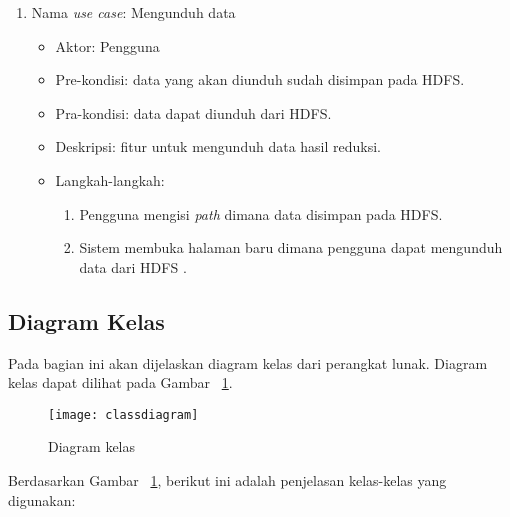 \begin{enumerate}
\begin{itemize}
\end{itemize}


\item Nama \textit{use case}: Mengunduh data

\begin{itemize}
\item Aktor: Pengguna

\item Pre-kondisi: data yang akan diunduh sudah disimpan pada HDFS.

\item Pra-kondisi: data dapat diunduh dari HDFS.

\item Deskripsi: fitur untuk mengunduh data hasil reduksi.

\item Langkah-langkah:

\begin{enumerate}

\item Pengguna mengisi \textit{path} dimana data disimpan pada HDFS.

\item Sistem membuka halaman baru dimana pengguna dapat mengunduh data dari HDFS .

\end{enumerate}

\end{itemize}

\end{enumerate}


\subsection{Diagram Kelas}

Pada bagian ini akan dijelaskan diagram kelas dari perangkat lunak. Diagram kelas dapat dilihat pada Gambar ~\ref{fig:classdiagram}.

\begin{figure}[H]
    \centering  
    \texttt{[image: classdiagram]}  
    \caption[Diagram kelas]{Diagram kelas} 
    \label{fig:classdiagram} 
\end{figure}

Berdasarkan Gambar ~\ref{fig:classdiagram}, berikut ini adalah penjelasan kelas-kelas yang digunakan:

